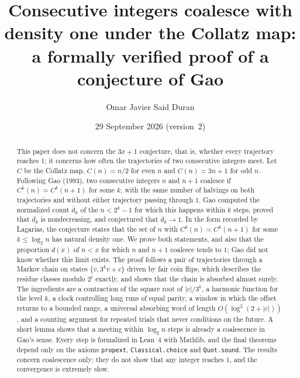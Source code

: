 \documentclass[11pt]{amsart}
\theoremstyle{definition}
\theoremstyle{remark}
\newcommand{\dbar}{\bar d}
\begin{document}
\title[Consecutive integers coalesce with density one]{Consecutive integers coalesce with density one under the Collatz map: a formally verified proof of a conjecture of Gao}

\author[O. J. Said Duran]{Omar Javier Said Duran}
\address{Independent Researcher}

\date{29 September 2026 (version~2)}

\begin{abstract}
This paper does not concern the $3x+1$ conjecture, that is, whether every trajectory reaches $1$; it concerns how often the trajectories of two consecutive integers meet. Let $C$ be the Collatz map, $C(n)=n/2$ for even $n$ and $C(n)=3n+1$ for odd $n$. Following Gao (1993), two consecutive integers $n$ and $n+1$ coalesce if $C^{k}(n)=C^{k}(n+1)$ for some $k$, with the same number of halvings on both trajectories and without either trajectory passing through $1$. Gao computed the normalized count $\dbar_k$ of the $n<2^k-1$ for which this happens within $k$ steps, proved that $\dbar_k$ is nondecreasing, and conjectured that $\dbar_k\to 1$. In the form recorded by Lagarias, the conjecture states that the set of $n$ with $C^{k}(n)=C^{k}(n+1)$ for some $k\le\log_2 n$ has natural density one. We prove both statements, and also that the proportion $d(x)$ of $n<x$ for which $n$ and $n+1$ coalesce tends to $1$; Gao did not know whether this limit exists. The proof follows a pair of trajectories through a Markov chain on states $\{v,3^k v+c\}$ driven by fair coin flips, which describes the residue classes modulo $2^t$ exactly, and shows that the chain is absorbed almost surely. The ingredients are a contraction of the square root of $|c|/3^k$, a harmonic function for the level $k$, a clock controlling long runs of equal parity, a window in which the offset returns to a bounded range, a universal absorbing word of length $O(\log^2(2+|c|))$, and a counting argument for repeated trials that never conditions on the future. A short lemma shows that a meeting within $\log_2 n$ steps is already a coalescence in Gao's sense. Every step is formalized in Lean~4 with Mathlib, and the final theorems depend only on the axioms \texttt{propext}, \texttt{Classical.choice} and \texttt{Quot.sound}. The results concern coalescence only: they do not show that any integer reaches $1$, and the convergence is extremely slow.
\end{abstract}

\end{document}
